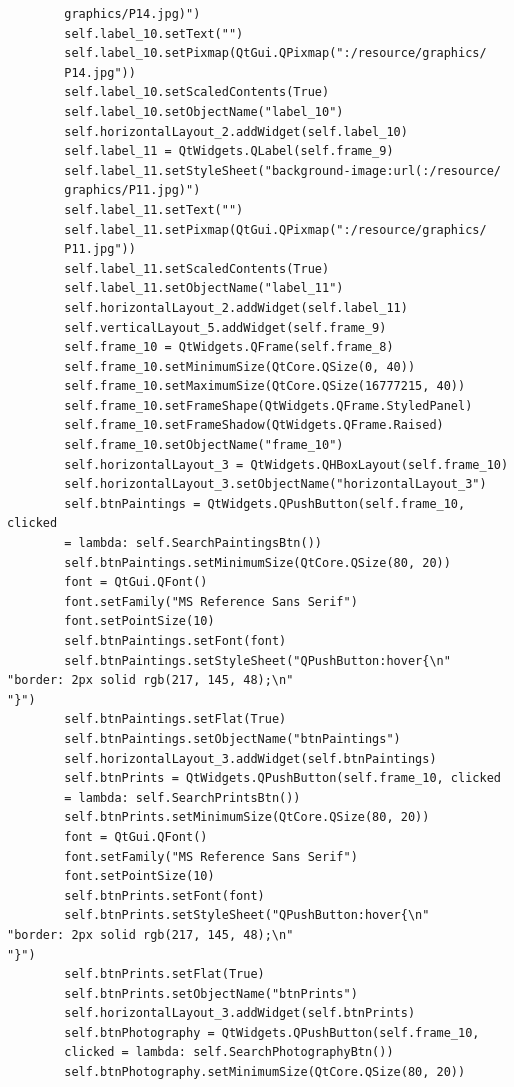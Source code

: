 \documentclass[12pt]{article}
\begin{document}
\begin{verbatim}
        graphics/P14.jpg)")
        self.label_10.setText("")
        self.label_10.setPixmap(QtGui.QPixmap(":/resource/graphics/
        P14.jpg"))
        self.label_10.setScaledContents(True)
        self.label_10.setObjectName("label_10")
        self.horizontalLayout_2.addWidget(self.label_10)
        self.label_11 = QtWidgets.QLabel(self.frame_9)
        self.label_11.setStyleSheet("background-image:url(:/resource/
        graphics/P11.jpg)")
        self.label_11.setText("")
        self.label_11.setPixmap(QtGui.QPixmap(":/resource/graphics/
        P11.jpg"))
        self.label_11.setScaledContents(True)
        self.label_11.setObjectName("label_11")
        self.horizontalLayout_2.addWidget(self.label_11)
        self.verticalLayout_5.addWidget(self.frame_9)
        self.frame_10 = QtWidgets.QFrame(self.frame_8)
        self.frame_10.setMinimumSize(QtCore.QSize(0, 40))
        self.frame_10.setMaximumSize(QtCore.QSize(16777215, 40))
        self.frame_10.setFrameShape(QtWidgets.QFrame.StyledPanel)
        self.frame_10.setFrameShadow(QtWidgets.QFrame.Raised)
        self.frame_10.setObjectName("frame_10")
        self.horizontalLayout_3 = QtWidgets.QHBoxLayout(self.frame_10)
        self.horizontalLayout_3.setObjectName("horizontalLayout_3")
        self.btnPaintings = QtWidgets.QPushButton(self.frame_10, clicked
        = lambda: self.SearchPaintingsBtn())
        self.btnPaintings.setMinimumSize(QtCore.QSize(80, 20))
        font = QtGui.QFont()
        font.setFamily("MS Reference Sans Serif")
        font.setPointSize(10)
        self.btnPaintings.setFont(font)
        self.btnPaintings.setStyleSheet("QPushButton:hover{\n"
"border: 2px solid rgb(217, 145, 48);\n"
"}")
        self.btnPaintings.setFlat(True)
        self.btnPaintings.setObjectName("btnPaintings")
        self.horizontalLayout_3.addWidget(self.btnPaintings)
        self.btnPrints = QtWidgets.QPushButton(self.frame_10, clicked 
        = lambda: self.SearchPrintsBtn())
        self.btnPrints.setMinimumSize(QtCore.QSize(80, 20))
        font = QtGui.QFont()
        font.setFamily("MS Reference Sans Serif")
        font.setPointSize(10)
        self.btnPrints.setFont(font)
        self.btnPrints.setStyleSheet("QPushButton:hover{\n"
"border: 2px solid rgb(217, 145, 48);\n"
"}")
        self.btnPrints.setFlat(True)
        self.btnPrints.setObjectName("btnPrints")
        self.horizontalLayout_3.addWidget(self.btnPrints)
        self.btnPhotography = QtWidgets.QPushButton(self.frame_10,
        clicked = lambda: self.SearchPhotographyBtn())
        self.btnPhotography.setMinimumSize(QtCore.QSize(80, 20))

\end{verbatim}
\end{document}
